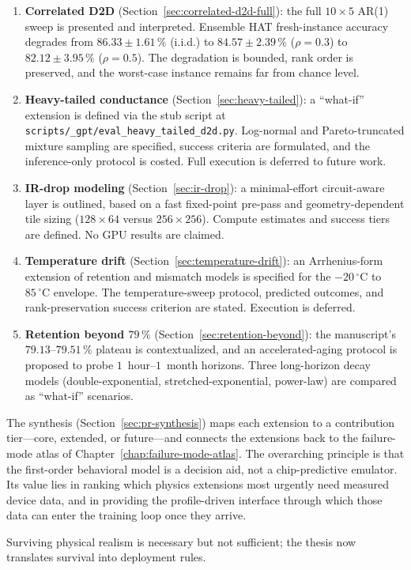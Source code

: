 \begin{enumerate}
    \item \textbf{Correlated D2D} (Section~\ref{sec:correlated-d2d-full}): the full $10 \times 5$ AR(1) sweep is presented and interpreted.  Ensemble HAT fresh-instance accuracy degrades from $86.33\pm1.61\,\%$ (i.i.d.) to $84.57\pm2.39\,\%$ ($\rho=0.3$) to $82.12\pm3.95\,\%$ ($\rho=0.5$).  The degradation is bounded, rank order is preserved, and the worst-case instance remains far from chance level.
    
    \item \textbf{Heavy-tailed conductance} (Section~\ref{sec:heavy-tailed}): a ``what-if'' extension is defined via the stub script at \texttt{scripts/\_gpt/eval\_heavy\_tailed\_d2d.py}.  Log-normal and Pareto-truncated mixture sampling are specified, success criteria are formulated, and the inference-only protocol is costed.  Full execution is deferred to future work.
    
    \item \textbf{IR-drop modeling} (Section~\ref{sec:ir-drop}): a minimal-effort circuit-aware layer is outlined, based on a fast fixed-point pre-pass and geometry-dependent tile sizing ($128 \times 64$ versus $256 \times 256$).  Compute estimates and success tiers are defined.  No GPU results are claimed.
    
    \item \textbf{Temperature drift} (Section~\ref{sec:temperature-drift}): an Arrhenius-form extension of retention and mismatch models is specified for the $-20\,^{\circ}\mathrm{C}$ to $85\,^{\circ}\mathrm{C}$ envelope.  The temperature-sweep protocol, predicted outcomes, and rank-preservation success criterion are stated.  Execution is deferred.
    
    \item \textbf{Retention beyond $79\,\%$} (Section~\ref{sec:retention-beyond}): the manuscript's $79.13$--$79.51\,\%$ plateau is contextualized, and an accelerated-aging protocol is proposed to probe $1$~hour--$1$~month horizons.  Three long-horizon decay models (double-exponential, stretched-exponential, power-law) are compared as ``what-if'' scenarios.
\end{enumerate}

The synthesis (Section~\ref{sec:pr-synthesis}) maps each extension to a contribution tier---core, extended, or future---and connects the extensions back to the failure-mode atlas of Chapter~\ref{chap:failure-mode-atlas}.  The overarching principle is that the first-order behavioral model is a decision aid, not a chip-predictive emulator.  Its value lies in ranking which physics extensions most urgently need measured device data, and in providing the profile-driven interface through which those data can enter the training loop once they arrive.

Surviving physical realism is necessary but not sufficient; the thesis now translates survival into deployment rules.

